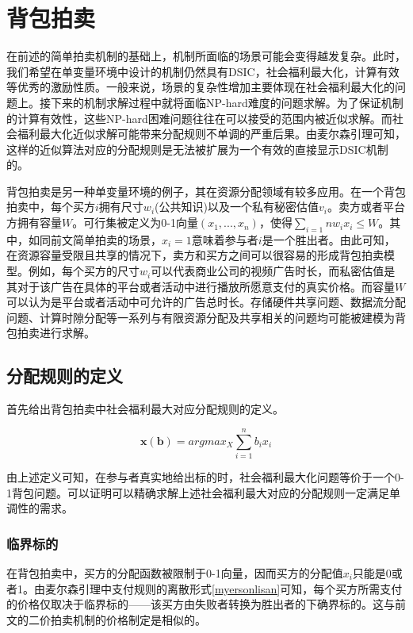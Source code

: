 \documentclass[promaster]{thesis-uestc}
\begin{document}
\section{背包拍卖}
在前述的简单拍卖机制的基础上，机制所面临的场景可能会变得越发复杂。此时，我们希望在单变量环境中设计的机制仍然具有DSIC，社会福利最大化，计算有效等优秀的激励性质。一般来说，场景的复杂性增加主要体现在社会福利最大化的问题上。接下来的机制求解过程中就将面临NP-hard难度的问题求解。为了保证机制的计算有效性，这些NP-hard困难问题往往在可以接受的范围内被近似求解。而社会福利最大化近似求解可能带来分配规则不单调的严重后果。由麦尔森引理可知，这样的近似算法对应的分配规则是无法被扩展为一个有效的直接显示DSIC机制的。

背包拍卖是另一种单变量环境的例子，其在资源分配领域有较多应用。在一个背包拍卖中，每个买方$i$拥有尺寸$w_i$(公共知识)以及一个私有秘密估值$v_i$。卖方或者平台方拥有容量$W$。可行集被定义为0-1向量$(x_1,...,x_n)$，使得$\sum_{i=1}{n}{w_ix_i}\leq W$。其中，如同前文简单拍卖的场景，$x_i=1$意味着参与者$i$是一个胜出者。由此可知，在资源容量受限且共享的情况下，卖方和买方之间可以很容易的形成背包拍卖模型。例如，每个买方的尺寸$w_i$可以代表商业公司的视频广告时长，而私密估值是其对于该广告在具体的平台或者活动中进行播放所愿意支付的真实价格。而容量$W$可以认为是平台或者活动中可允许的广告总时长。存储硬件共享问题、数据流分配问题、计算时隙分配等一系列与有限资源分配及共享相关的问题均可能被建模为背包拍卖进行求解。
\subsection{分配规则的定义}
首先给出背包拍卖中社会福利最大对应分配规则的定义。
\begin{definition}[背包拍卖对应的分配规则]
    $$\mathbf{x(b)}=argmax_X{\sum_{i=1}^{n}{b_ix_i}}$$
\end{definition}
由上述定义可知，在参与者真实地给出标的时，社会福利最大化问题等价于一个0-1背包问题。可以证明可以精确求解上述社会福利最大对应的分配规则一定满足单调性的需求。
\subsubsection{临界标的}
在背包拍卖中，买方的分配函数被限制于0-1向量，因而买方的分配值$x_i$只能是0或者1。由麦尔森引理中支付规则的离散形式\ref{myersonlisan}可知，每个买方所需支付的价格仅取决于临界标的——该买方由失败者转换为胜出者的下确界标的。这与前文的二价拍卖机制的价格制定是相似的。
\end{document}
